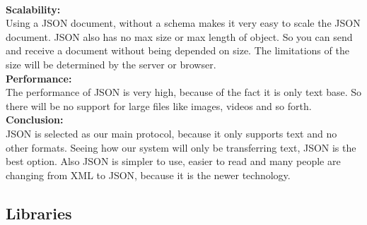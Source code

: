 \documentclass[12pt]{article}
\begin{document}
		\\\linebreak
		\textbf{Scalability:}
		\\\linebreak
		Using a JSON document, without a schema makes it very easy to scale the JSON document. JSON also has 		no max size or max length of object. So you can send and receive a document without being depended on 		size. The limitations of the size will be determined by the server or browser. 
		\\\linebreak
		\textbf{Performance:}
		\\\linebreak
		The performance of JSON is very high, because of the fact it is only text base. So there will be no 		support for large files like images, videos and so forth.
		\\\linebreak\linebreak
		\textbf{Conclusion:}
		\\\linebreak
		JSON is selected as our main protocol, because it only supports text and no other formats. Seeing how 		our system will only be transferring text, JSON is the best option. Also JSON is simpler to use, 			easier to read and many people are changing from XML to JSON, because it is the newer technology.
				
		\vspace{0.5cm}
				
		\subsection{Libraries}
		\vspace{0.5cm}
		
\end{document}
